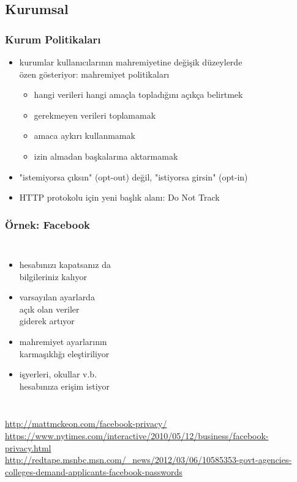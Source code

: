 \documentclass[dvipsnames]{beamer}
\theoremstyle{definition}
\theoremstyle{example}
\theoremstyle{plain}
\begin{document}
\subsection{Kurumsal}

\begin{frame}
  \frametitle{Kurum Politikaları}

  \begin{itemize}
    \item kurumlar kullanıcılarının mahremiyetine değişik düzeylerde\\
      özen gösteriyor: mahremiyet politikaları
    \begin{itemize}
      \item hangi verileri hangi amaçla topladığını açıkça belirtmek
      \item gerekmeyen verileri toplamamak
      \item amaca aykırı kullanmamak
      \item izin almadan başkalarına aktarmamak
    \end{itemize}

    \pause
    \medskip
    \item "istemiyorsa çıksın" (opt-out) değil, "istiyorsa girsin" (opt-in)

    \pause
    \medskip
    \item HTTP protokolu için yeni başlık alanı: Do Not Track
  \end{itemize}
\end{frame}

\begin{frame}
  \frametitle{Örnek: Facebook}

  \begin{columns}

    \begin{itemize}
      \item hesabınızı kapatsanız da\\
        bilgileriniz kalıyor
      \item varsayılan ayarlarda\\
        açık olan veriler\\
        giderek artıyor
      \item mahremiyet ayarlarının\\
        karmaşıklığı eleştiriliyor\\
      \item işyerleri, okullar v.b.\\
        hesabınıza erişim istiyor
    \end{itemize}
  \end{columns}

  \medskip
  \tiny{\url{http://mattmckeon.com/facebook-privacy/}}\\
  \tiny{\url{https://www.nytimes.com/interactive/2010/05/12/business/facebook-privacy.html}}\\
  \tiny{\url{http://redtape.msnbc.msn.com/_news/2012/03/06/10585353-govt-agencies-colleges-demand-applicants-facebook-passwords}}\\
\end{frame}
\end{document}
